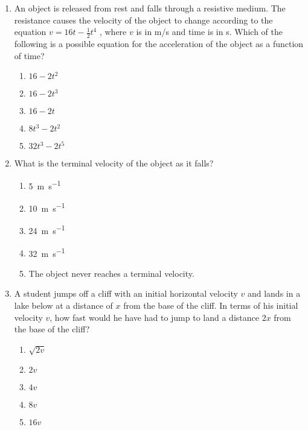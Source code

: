 \documentclass{../../oss-apphys}
\begin{document}
\begin{multicols}{2}
  \begin{enumerate}[resume,leftmargin=18pt]
  \item An object is released from rest and falls through a resistive medium.
    The resistance causes the velocity of the object to change according to the
    equation $v=16t-\frac{1}{2}t^4$ , where $v$ is in \si{m/s} and time is in
    \si{s}. Which of the following is a possible equation for the acceleration
    of the object as a function of time?
    \begin{enumerate}[noitemsep,topsep=0pt,leftmargin=18pt,label=(\Alph*)]
    \item $16-2t^2$
    \item $16-2t^3$
    \item $16-2t$
    \item $8t^3-2t^2$
    \item $32t^3-2t^5$
    \end{enumerate}
    
  \item What is the terminal velocity of the object as it falls?
    \begin{enumerate}[noitemsep,topsep=0pt,leftmargin=18pt,label=(\Alph*)]
    \item \SI{5 }{\metre\per\second}
    \item \SI{10}{\metre\per\second}
    \item \SI{24}{\metre\per\second}
    \item \SI{32}{\metre\per\second}
    \item The object never reaches a terminal velocity.
    \end{enumerate}
  
  \item A student jumps off a cliff with an initial horizontal velocity $v$ and
    lands in a lake below at a distance of $x$ from the base of the cliff. In
    terms of his initial velocity $v$, how fast would he have had to jump to
    land a distance $2x$ from the base of the cliff?
    \begin{center}
    \end{center}
    \begin{enumerate}[noitemsep,topsep=0pt,leftmargin=18pt,label=(\Alph*)]
    \item $\sqrt{2v}$
    \item $2v$
    \item $4v$
    \item $8v$
    \item $16v$
    \end{enumerate}


\end{enumerate}
\end{multicols}
\end{document}
